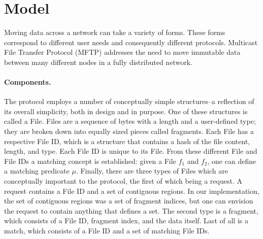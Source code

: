 \documentclass[letterpaper]{article}
\begin{document}



\pagebreak

\section{Model\label{model}}

Moving data across a network can take a variety of forms. These forms correspond to different user needs and consequently different protocols. Multicast File Transfer Protocol (MFTP) addresses the need to move immutable data between many different nodes in a fully distributed network. 
\paragraph {Components.}
The protocol employs a number of conceptually simple structures--a reflection of its overall simplicity, both in design and in purpose.
One of these structures is called a File. 
Files are a sequence of bytes with a length and a user-defined type; they are broken down into equally sized pieces called fragments.  
Each File has a respective File ID, which is a structure that contains a hash of the file content, length, and type. 
Each File ID is unique to its File.
From these different File and File IDs a matching concept is established: given a File $f_1$ and $f_2$, one can define a matching predicate $\mu$.
Finally, there are three types of Files which are conceptually important to the protocol, the first of which being a request.
A request contains a File ID and a set of contiguous regions.  In our implementation, the set of contiguous regions was a set of fragment indices, but one can envision the request to contain anything that defines a set.
The second type is a fragment, which consists of a File ID, fragment index, and the data itself.
Last of all is a match, which consists of a File ID and a set of matching File IDs.
\end{document}
